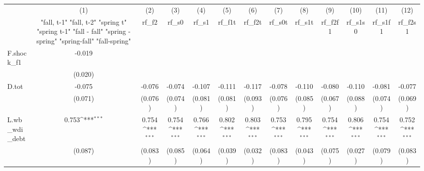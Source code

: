 {
\def\sym#1{\ifmmode^{#1}\else\(^{#1}\)\fi}
\begin{tabular}{l*{12}{c}}
\toprule
            &\multicolumn{1}{c}{(1)}&\multicolumn{1}{c}{(2)}&\multicolumn{1}{c}{(3)}&\multicolumn{1}{c}{(4)}&\multicolumn{1}{c}{(5)}&\multicolumn{1}{c}{(6)}&\multicolumn{1}{c}{(7)}&\multicolumn{1}{c}{(8)}&\multicolumn{1}{c}{(9)}&\multicolumn{1}{c}{(10)}&\multicolumn{1}{c}{(11)}&\multicolumn{1}{c}{(12)}\\
            &\multicolumn{1}{c}{  "fall, t-1" "fall, t-2" "spring t" "spring t-1"  "fall - fall" "spring - spring" "spring-fall" "fall-spring" }&\multicolumn{1}{c}{rf\_f2}&\multicolumn{1}{c}{rf\_s0}&\multicolumn{1}{c}{rf\_s1}&\multicolumn{1}{c}{rf\_f1t}&\multicolumn{1}{c}{rf\_f2t}&\multicolumn{1}{c}{rf\_s0t}&\multicolumn{1}{c}{rf\_s1t}&\multicolumn{1}{c}{rf\_f2f1}&\multicolumn{1}{c}{rf\_s1s0}&\multicolumn{1}{c}{rf\_s1f1}&\multicolumn{1}{c}{rf\_f2s1}\\
\midrule
F.shock\_f1  &      -0.019         &                     &                     &                     &                     &                     &                     &                     &                     &                     &                     &                     \\
            &     (0.020)         &                     &                     &                     &                     &                     &                     &                     &                     &                     &                     &                     \\
\addlinespace
D.tot       &      -0.075         &      -0.076         &      -0.074         &      -0.107         &      -0.111         &      -0.117         &      -0.078         &      -0.110         &      -0.080         &      -0.110         &      -0.081         &      -0.077         \\
            &     (0.071)         &     (0.076)         &     (0.074)         &     (0.081)         &     (0.081)         &     (0.093)         &     (0.076)         &     (0.085)         &     (0.067)         &     (0.088)         &     (0.074)         &     (0.069)         \\
\addlinespace
L.wb\_wdi\_debt&       0.753\sym{***}&       0.754\sym{***}&       0.754\sym{***}&       0.766\sym{***}&       0.802\sym{***}&       0.803\sym{***}&       0.753\sym{***}&       0.795\sym{***}&       0.754\sym{***}&       0.806\sym{***}&       0.754\sym{***}&       0.752\sym{***}\\
            &     (0.087)         &     (0.083)         &     (0.085)         &     (0.064)         &     (0.039)         &     (0.032)         &     (0.083)         &     (0.043)         &     (0.075)         &     (0.027)         &     (0.079)         &     (0.083)         \\

\end{tabular}}
